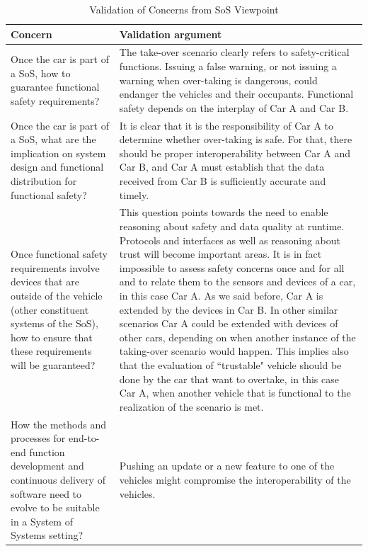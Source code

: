 \begin{longtable}{p{}p{}}
\caption{Validation of Concerns from SoS Viewpoint}\\
\small
\label{tab:sos-concerns}
\textbf{Concern} & \textbf{Validation argument}\\
\hline
\endhead
Once the car is part of a SoS, how to guarantee functional safety requirements? & 
The take-over scenario clearly refers to safety-critical functions. 
Issuing a false warning, or not issuing a warning when over-taking is dangerous, could endanger the vehicles and their occupants. 
Functional safety depends on the interplay of Car A and Car B.\\
\hline
Once the car is part of a SoS, what are the implication on system design and functional distribution for functional safety? & 
It is clear that it is the responsibility of Car A to determine whether over-taking is safe. 
For that, there should be proper interoperability between Car A and Car B, and Car A must establish that the data received from Car B is sufficiently accurate and timely.\\
\hline
Once functional safety requirements involve devices that are outside of the vehicle (other constituent systems of the SoS), how to ensure that these requirements will be guaranteed?
& 
This question points towards the need to enable reasoning about safety and data quality at runtime. 
Protocols and interfaces as well as reasoning about trust will become important areas.
It is in fact impossible to assess safety concerns once and for all and to relate them to the sensors and devices of a car, in this case Car A.
As we said before, Car A is extended by the devices in Car B.
In other similar scenarios Car A could be extended with devices of other cars, depending on when another instance of the taking-over scenario would happen.
This implies also that the evaluation of ``trustable" vehicle should be done by the car that want to overtake, in this case Car A, when another vehicle that is functional to the realization of the scenario is met.\\
\hline
How the methods and processes for end-to-end function development and continuous delivery of software need to evolve to be suitable in a System of Systems setting? & 
Pushing an update or a new feature to one of the vehicles might compromise the interoperability of the vehicles.

\end{longtable}
